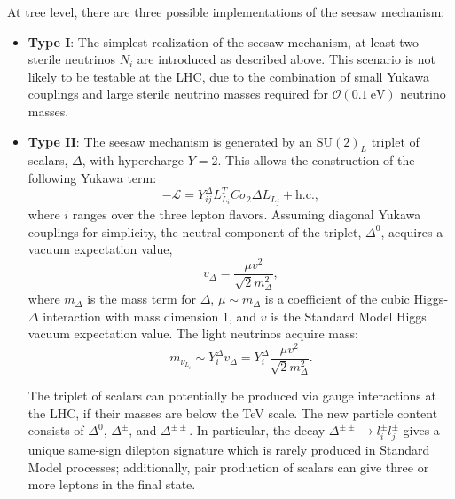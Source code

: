 At tree level, there are three possible implementations of the seesaw mechanism: 
\begin{itemize}
	\item \textbf{Type I}: The simplest realization of the seesaw mechanism, at least two sterile neutrinos $N_i$ are introduced as described above. This scenario is not likely to be testable at the LHC, due to the combination of small Yukawa couplings and large sterile neutrino masses required for $\mathcal{O}(0.1~\mbox{eV})$ neutrino masses. 

	\item \textbf{Type II}: The seesaw mechanism is generated by an $\mathrm{SU}(2)_L$ triplet of scalars, $\Delta$, with hypercharge $Y=2$. This allows the construction of the following Yukawa term:
	\begin{equation}
		-\mathcal{L} = Y^{\Delta}_{ij} L_{L_i}^T C \sigma_2 \Delta L_{L_j} + \mathrm{h.c.},
	\end{equation}
	where $i$ ranges over the three lepton flavors.  Assuming diagonal Yukawa couplings for simplicity, the neutral component of the triplet, $\Delta^0$, acquires a vacuum expectation value,
	\begin{equation}
		v_{\Delta} = \frac{\mu v^2}{\sqrt{2} m_{\Delta}^2},
	\end{equation}
	where $m_{\Delta}$ is the mass term for $\Delta$, $\mu\sim m_{\Delta}$ is a coefficient of the cubic Higgs-$\Delta$ interaction with mass dimension 1, and $v$ is the Standard Model Higgs vacuum expectation value. The light neutrinos acquire mass:
	\begin{equation}
		m_{\nu_{L_i}} \sim Y^{\Delta}_{i} v_{\Delta}=Y^{\Delta}_{i} \frac{\mu v^2}{\sqrt{2} m_{\Delta}^2}.
	\end{equation}

	The triplet of scalars can potentially be produced via gauge interactions at the LHC, if their masses are below the TeV scale. The new particle content consists of $\Delta^0$, $\Delta^{\pm}$, and $\Delta^{\pm\pm}$. In particular, the decay $\Delta^{\pm\pm}\rightarrow l^{\pm}_i l^{\pm}_j$ gives a unique same-sign dilepton signature which is rarely produced in Standard Model processes; additionally, pair production of scalars can give three or more leptons in the final state. 


\end{itemize}

